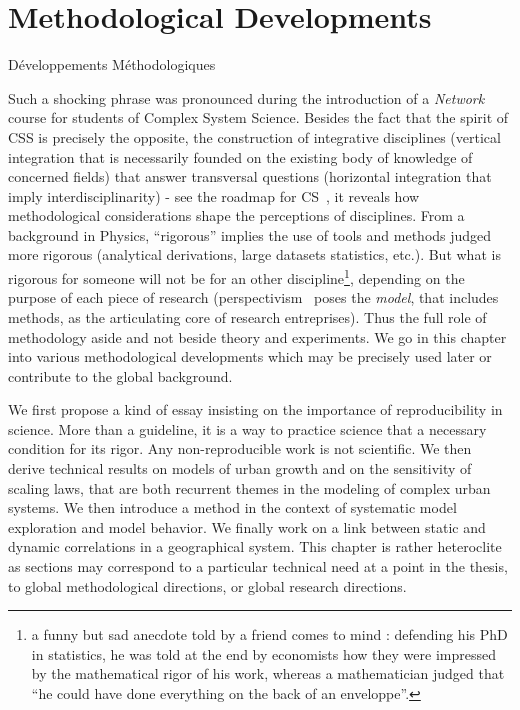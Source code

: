 



\chapter{Methodological Developments}{Développements Méthodologiques} %

\label{ch:methodology} %



\bigskip

Such a shocking phrase was pronounced during the introduction of a \emph{Network} course for students of Complex System Science. Besides the fact that the spirit of CSS is precisely the opposite, {\ie} the construction of integrative disciplines (vertical integration that is necessarily founded on the existing body of knowledge of concerned fields) that answer transversal questions (horizontal integration that imply interdisciplinarity) - see {\eg} the roadmap for CS~\cite{2009arXiv0907.2221B}, it reveals how methodological considerations shape the perceptions of disciplines. From a background in Physics, ``rigorous'' implies the use of tools and methods judged more rigorous (analytical derivations, large datasets statistics, etc.). But what is rigorous for someone will not be for an other discipline\footnote{a funny but sad anecdote told by a friend comes to mind : defending his PhD in statistics, he was told at the end by economists how they were impressed by the mathematical rigor of his work, whereas a mathematician judged that ``he could have done everything on the back of an enveloppe''.}, depending on the purpose of each piece of research (perspectivism~\cite{giere2010scientific} poses the \emph{model}, that includes methods, as the articulating core of research entreprises). Thus the full role of methodology aside and not beside theory and experiments. We go in this chapter into various methodological developments which may be precisely used later or contribute to the global background.

We first propose a kind of essay insisting on the importance of reproducibility in science. More than a guideline, it is a way to practice science that a necessary condition for its rigor. Any non-reproducible work is not scientific. We then derive technical results on models of urban growth and on the sensitivity of scaling laws, that are both recurrent themes in the modeling of complex urban systems. We then introduce a method in the context of systematic model exploration and model behavior. We finally work on a link between static and dynamic correlations in a geographical system. This chapter is rather heteroclite as sections may correspond to a particular technical need at a point in the thesis, to global methodological directions, or global research directions.



